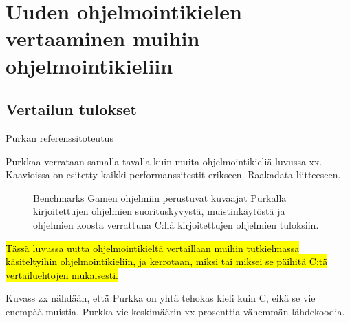 \section{Uuden ohjelmointikielen vertaaminen muihin ohjelmointikieliin}

\subsection{Vertailun tulokset}

Purkan referenssitoteutus \citep{purkka}

Purkkaa verrataan samalla tavalla kuin muita ohjelmointikieliä luvussa xx.
Kaavioissa on esitetty kaikki performanssitestit erikseen. Raakadata liitteeseen.

\begin{figure}[ht!]
    \begin{adjustbox}{center}
        \begin{minipage}{1.2\textwidth}
        
        \end{minipage}
    \end{adjustbox}

    \begin{adjustbox}{center}
        \begin{minipage}{1.2\textwidth}
        
        \end{minipage}
    \end{adjustbox}

    \begin{adjustbox}{center}
        \begin{minipage}{1.2\textwidth}
        
        \end{minipage}
    \end{adjustbox}
    \caption{
        Benchmarks Gamen ohjelmiin perustuvat kuvaajat Purkalla kirjoitettujen ohjelmien
        suorituskyvystä, muistinkäytöstä ja ohjelmien koosta verrattuna C:llä
        kirjoitettujen ohjelmien tuloksiin.}
    \label{fig:benchmarksgame}
\end{figure}

\hl{Tässä luvussa uutta ohjelmointikieltä vertaillaan muihin tutkielmassa
käsiteltyihin ohjelmointikieliin, ja kerrotaan, miksi tai miksei se päihitä
C:tä vertailuehtojen mukaisesti.}

Kuvass zx nähdään, että Purkka on yhtä tehokas kieli kuin C, eikä se vie
enempää muistia. Purkka vie keskimäärin xx prosenttia vähemmän lähdekoodia.

